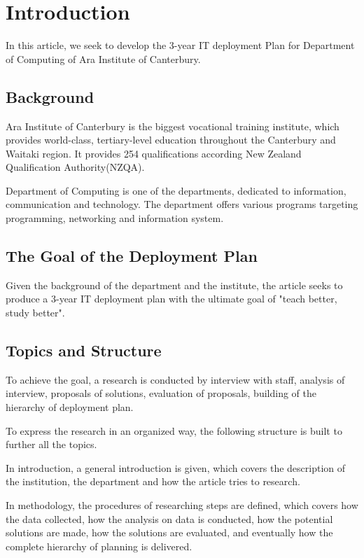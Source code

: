 

\section{Introduction}

In this article, we seek to develop the 3-year IT deployment Plan for Department of Computing of Ara Institute of Canterbury.

\subsection{Background}
Ara Institute of Canterbury is the biggest vocational training institute, which provides world-class, tertiary-level education throughout the Canterbury and Waitaki region. It provides 254 qualifications according New Zealand Qualification Authority(NZQA).

Department of Computing is one of the departments, dedicated to information, communication and technology. The department offers various programs targeting programming, networking and information system.


\subsection{The Goal of the Deployment Plan}
Given the background of the department and the institute, the article seeks to produce a 3-year IT deployment plan with the ultimate goal of "teach better, study better".


\subsection{Topics and Structure}
To achieve the goal, a research is conducted by interview with staff, analysis of interview, proposals of solutions, evaluation of proposals, building of the hierarchy of deployment plan.

To express the research in an organized way, the following structure is built to further all the topics.

In introduction, a general introduction is given, which covers the description of the institution, the department and how the article tries to research.

In methodology, the procedures of researching steps are defined, which covers how the data collected, how the analysis on data is conducted, how the potential solutions are made, how the solutions are evaluated, and eventually how the complete hierarchy of planning is delivered.

